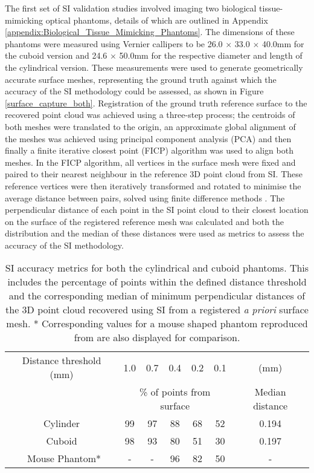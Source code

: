 \documentclass[twoside]{bhamthesis}
\theoremstyle{definition}
\begin{document}
The first set of SI validation studies involved imaging two biological tissue-mimicking optical phantoms, details of which are outlined in Appendix \ref{appendix:Biological_Tissue_Mimicking_Phantoms}. The dimensions of these phantoms were measured using Vernier callipers to be 26.0 $\times$ 33.0 $\times$ 40.0mm for the cuboid version and 24.6 $\times$ 50.0mm for the respective diameter and length of the cylindrical version. These measurements were used to generate geometrically accurate surface meshes, representing the ground truth against which the accuracy of the SI methodology could be assessed, as shown in Figure \ref{surface_capture_both}. Registration of the ground truth reference surface to the recovered point cloud was achieved using a three-step process; the centroids of both meshes were translated to the origin, an approximate global alignment of the meshes was achieved using principal component analysis (PCA) and then finally a finite iterative closest point (FICP) algorithm was used to align both meshes. In the FICP algorithm, all vertices in the surface mesh were fixed and paired to their nearest neighbour in the reference 3D point cloud from SI. These reference vertices were then iteratively transformed and rotated to minimise the average distance between pairs, solved using finite difference methods \cite{chen1992object}. The perpendicular distance of each point in the SI point cloud to their closest location on the surface of the registered reference mesh was calculated and both the distribution and the median of these distances were used as metrics to assess the accuracy of the SI methodology.
 
\bgroup
\def\arraystretch{1.2}
\begin{table}[!ht]
\small
\begin{center}
 \begin{tabular}{c | c c c c c | c} 
 \hline
Distance threshold (mm) & 1.0 & 0.7 & 0.4 & 0.2 & 0.1 & (mm) \\ 
 & \multicolumn{5}{c|}{\% of points from surface} & Median distance \\  
 \hline
Cylinder & 99 & 97 & 88 & 68 & 52 & 0.194 \\ 
Cuboid & 98 & 93 & 80 & 51 & 30 & 0.197\\\ 
Mouse Phantom* & - & - & 96 & 82 & 50 & - \\
 \hline
\end{tabular}
\caption{SI accuracy metrics for both the cylindrical and cuboid phantoms. This includes the percentage of points within the defined distance threshold and the corresponding median of minimum perpendicular distances of the 3D point cloud recovered using SI from a registered \textit{a priori} surface mesh. * Corresponding values for a mouse shaped phantom reproduced from \cite{basevi2013simultaneous} are also displayed for comparison. }
\label{tab:Surface_capture_error_table}
\end{center}
\end{table}
\egroup
\end{document}
